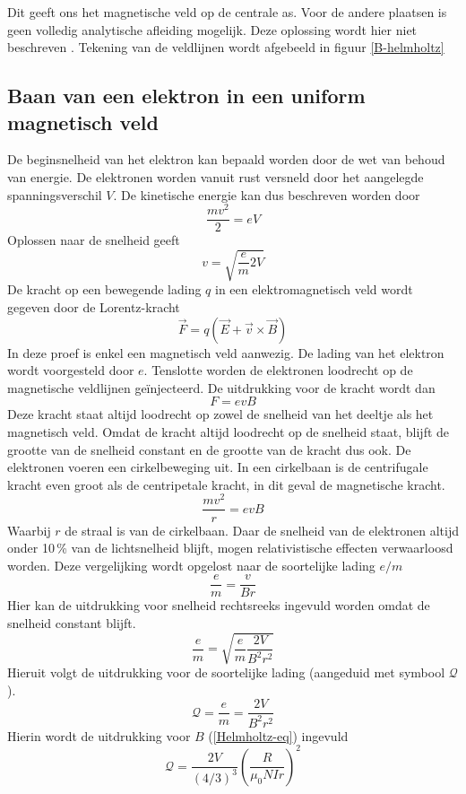 Dit geeft ons het magnetische veld op de centrale as. Voor de andere plaatsen 
is geen volledig analytische afleiding mogelijk. Deze oplossing wordt hier niet 
beschreven \cite{magnVeldHelmholtz}.
Tekening van de veldlijnen wordt afgebeeld in figuur \ref{B-helmholtz}


\subsection{Baan van een elektron in een uniform magnetisch veld}

De beginsnelheid van het elektron kan bepaald worden door de wet van behoud van 
energie. De elektronen worden vanuit rust versneld door het aangelegde 
spanningsverschil $V$. De kinetische energie kan dus beschreven worden door
$$
\frac{mv^2}{2} = eV
$$
Oplossen naar de snelheid geeft
$$
v = \sqrt{ \frac{e}{m} 2V }
$$
De kracht op een bewegende lading $q$ in een elektromagnetisch veld wordt 
gegeven door de Lorentz-kracht
$$
\vec{F} = q(\vec{E} + \vec{v} \times \vec{B})
$$
In deze proef is enkel een magnetisch veld aanwezig. De lading van het elektron 
wordt voorgesteld door $e$. Tenslotte worden de elektronen loodrecht op de 
magnetische veldlijnen ge\"injecteerd. De uitdrukking voor de kracht wordt dan
$$
F = e v B
$$
Deze kracht staat altijd loodrecht op zowel de snelheid van het deeltje als het 
magnetisch veld. Omdat de kracht altijd loodrecht op de snelheid staat, blijft 
de grootte van de snelheid constant en de grootte van de kracht dus ook. De 
elektronen voeren een cirkelbeweging uit. In een cirkelbaan is de centrifugale 
kracht even groot als de centripetale kracht, in dit geval de magnetische 
kracht.
$$
\frac{mv^2}{r} = evB
$$
Waarbij $r$ de straal is van de cirkelbaan.
Daar de snelheid van de elektronen altijd onder 10\,\% van de lichtsnelheid 
blijft, mogen relativistische effecten verwaarloosd worden. Deze vergelijking 
wordt opgelost naar de soortelijke lading $e/m$
$$
\frac{e}{m} = \frac{v}{Br}
$$
Hier kan de uitdrukking voor snelheid rechtsreeks ingevuld worden omdat de 
snelheid constant blijft.
$$
\frac{e}{m} = \sqrt{\frac{e}{m} \frac{2V}{B^2r^2}}
$$
Hieruit volgt de uitdrukking voor de soortelijke lading (aangeduid met symbool 
$\mathcal{Q}$).
$$
\mathcal{Q} = \frac{e}{m} = \frac{2V}{B^2r^2}
$$
Hierin wordt de uitdrukking voor $B$ (\ref{Helmholtz-eq}) ingevuld
\begin{equation}
\label{em-equation}
\mathcal{Q} = \frac{2V}{(4/3)^3} \left( \frac{R}{\mu_0NIr} \right)^2
\end{equation}
